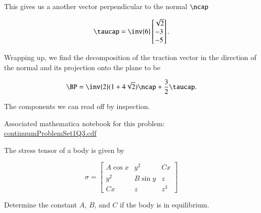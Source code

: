 \begin{Answer}[ref={problem:continuumProblemSet1:q3}]
This gives us a another vector perpendicular to the normal $\ncap$

\begin{equation}\label{eqn:continuumProblemSet1:490}
\taucap = 
\inv{6}
\begin{bmatrix}
\sqrt{2} \\
-3 \\
-5
\end{bmatrix}.
\end{equation}

Wrapping up, we find the decomposition of the traction vector in the direction of the normal and its projection onto the plane to be

\begin{equation}\label{eqn:continuumProblemSet1:510}
\BP 
= 
\inv{2}(1 + 4\sqrt{2}) \ncap
+
\frac{3}{2} \taucap.
\end{equation}

The components we can read off by inspection.

Associated mathematica notebook for this problem:
\href{https://raw.github.com/peeterjoot/physicsplay/master/notes/phy454/mathematica/continuumProblemSet1Q3.cdf}{continuumProblemSet1Q3.cdf}
\end{Answer}

\begin{Exercise}[title={Stress and equilibrium}, label={problem:continuumProblemSet1:q4}]
The stress tensor of a body is given by

\begin{equation}\label{eqn:continuumProblemSet1:90}
\sigma =
\begin{bmatrix}
A \cos x & y^2 & C x \\
y^2 & B \sin y & z \\
C x & z & z^3
\end{bmatrix}
\end{equation}

Determine the constant $A$, $B$, and $C$ if the body is in equilibrium.
\end{Exercise}

